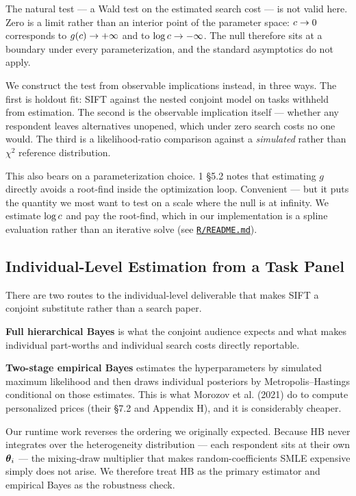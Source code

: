 \documentclass[
  letterpaper,
  DIV=11,
  numbers=noendperiod]{scrartcl}
\begin{document}
The natural test --- a Wald test on the estimated search cost --- is not
valid here. Zero is a limit rather than an interior point of the
parameter space: \(c \to 0\) corresponds to \(g(c) \to +\infty\)
and to \(\log c \to -\infty\). The null therefore sits at a boundary
under every parameterization, and the standard asymptotics do not apply.

We construct the test from observable implications instead, in three
ways. The first is holdout fit: SIFT against the nested conjoint model
on tasks withheld from estimation. The second is the observable
implication itself --- whether any respondent leaves alternatives
unopened, which under zero search costs no one would. The third is a
likelihood-ratio comparison against a \emph{simulated} rather than
\(\chi^2\) reference distribution.

This also bears on a parameterization choice. 1 §5.2 notes that
estimating \(g\) directly avoids a root-find inside the optimization
loop. Convenient --- but it puts the quantity we most want to test on a
scale where the null is at infinity. We estimate \(\log c\) and pay
the root-find, which in our implementation is a spline evaluation rather
than an iterative solve (see
\href{../R/README.md}{\texttt{R/README.md}}).

\subsection{Individual-Level Estimation from a Task
Panel}\label{sec-est-panel}

There are two routes to the individual-level deliverable that makes SIFT
a conjoint substitute rather than a search paper.

\textbf{Full hierarchical Bayes} is what the conjoint audience expects
and what makes individual part-worths and individual search costs
directly reportable.

\textbf{Two-stage empirical Bayes} estimates the hyperparameters by
simulated maximum likelihood and then draws individual posteriors by
Metropolis--Hastings conditional on those estimates. This is what
Morozov et al. (2021) do to compute personalized prices (their §7.2 and
Appendix H), and it is considerably cheaper.

Our runtime work reverses the ordering we originally expected. Because
HB never integrates over the heterogeneity distribution --- each
respondent sits at their own \(\boldsymbol{\theta}_i\) --- the mixing-draw
multiplier that makes random-coefficients SMLE expensive simply does not
arise. We therefore treat HB as the primary estimator and empirical
Bayes as the robustness check.
\end{document}
